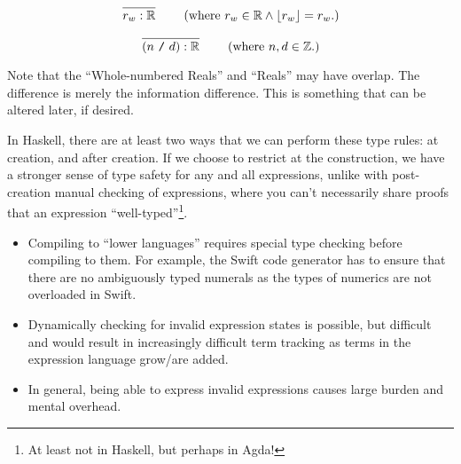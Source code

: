 \begin{equation}
      \left.
      \infer{r_w : \bb{R}}{}
      \right.
      \qquad
      \text{(where \(r_w \in \bb{R} \land \lfloor{} r_w \rfloor{} = r_w\).)}
      \label{tr:lit:wholeReal}
\end{equation}

\begin{equation}
      \left.
      \infer{(n\ \texttt{/}\ d) : \bb{R}}{}
      \right.
      \qquad
      \text{(where \(n, d \in \bb{Z}\).)}
      \label{tr:lit:fraction}
\end{equation}

Note that the ``Whole-numbered Reals'' and ``Reals'' may have overlap. The
difference is merely the information difference. This is something that can be
altered later, if desired.





In Haskell, there are at least two ways that we can perform these type rules: at
creation, and after creation. If we choose to restrict at the construction, we
have a stronger sense of type safety for any and all expressions, unlike with
post-creation manual checking of expressions, where you can't necessarily share
proofs that an expression ``well-typed''\footnote{At least not in Haskell, but
      perhaps in Agda!}.


\begin{itemize}

      \item Compiling to ``lower languages'' requires special type checking
            before compiling to them. For example, the Swift code generator has
            to ensure that there are no ambiguously typed numerals as the types
            of numerics are not overloaded in Swift.

      \item Dynamically checking for invalid expression states is possible, but
            difficult and would result in increasingly difficult term tracking
            as terms in the expression language grow/are added.

      \item In general, being able to express invalid expressions causes large
            burden and mental overhead.

\end{itemize}


